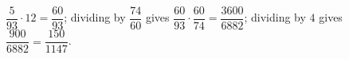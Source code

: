 $\dfrac5{93}\cdot12=\dfrac{60}{93}$; dividing by $\dfrac{74}{60}$ gives $\dfrac{60}{93}\cdot\dfrac{60}{74}=\dfrac{3600}{6882}$; dividing by $4$ gives $\dfrac{900}{6882}=\boxed{\dfrac{150}{1147}}$.
